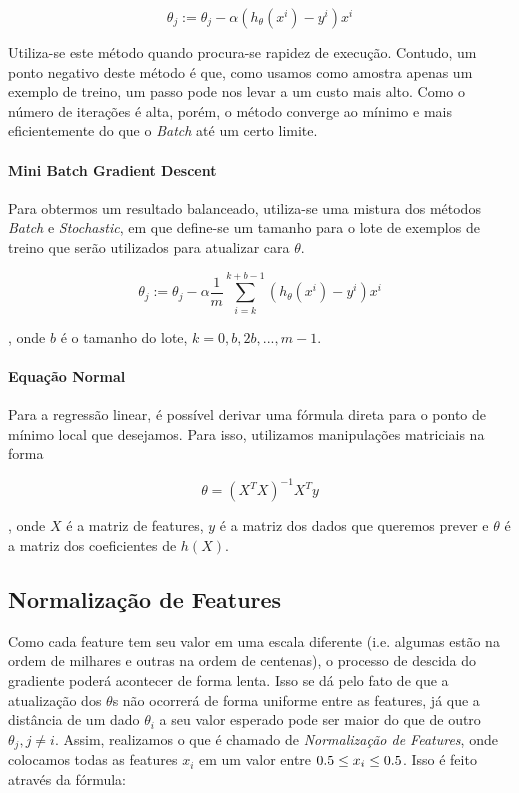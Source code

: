 \documentclass[conference]{IEEEtran}
\begin{document}
\begin{equation} \label{eq:stochastic_descent}
\theta_{j} := \theta_{j} - \alpha(h_{\theta}(x^{i}) - y^{i}) x^{i}
\end{equation}

Utiliza-se este método quando procura-se rapidez de execução. Contudo, um ponto negativo deste método é que, como usamos como amostra apenas um exemplo de treino, um passo pode nos levar a um custo mais alto. Como o número de iterações é alta, porém, o método converge ao mínimo e mais eficientemente do que o \textit{Batch} até um certo limite.

\paragraph{Mini Batch Gradient Descent}

Para obtermos um resultado balanceado, utiliza-se uma mistura dos métodos \textit{Batch} e \textit{Stochastic}, em que define-se um tamanho para o lote de exemplos de treino que serão utilizados para atualizar cara $\theta$.

\begin{equation} \label{eq:minibatch_descent}
\theta_{j} := \theta_{j} - \alpha \dfrac{1}{m} \sum_{i=k}^{k+b-1}(h_{\theta}(x^{i}) - y^{i}) x^{i}
\end{equation}

, onde $b$ é o tamanho do lote, $k = 0, b, 2b, ..., m-1$.

\paragraph{Equação Normal}

Para a regressão linear, é possível derivar uma fórmula direta para o ponto de mínimo local que desejamos. Para isso, utilizamos manipulações matriciais na forma~\cite{ayearofai}

\begin{equation} \label{eq:normal}
\theta = (X^{T}X)^{-1}X^{T}y
\end{equation}

, onde $X$ é a matriz de features, $y$ é a matriz dos dados que queremos prever e $\theta$ é a matriz dos coeficientes de $h(X)$.

\subsection{Normalização de Features}

Como cada feature tem seu valor em uma escala diferente (i.e. algumas estão na ordem de milhares e outras na ordem de centenas), o processo de descida do gradiente poderá acontecer de forma lenta. Isso se dá pelo fato de que a atualização dos $\theta$s não ocorrerá de forma uniforme entre as features, já que a distância de um dado $\theta_{i}$ a seu valor esperado pode ser maior do que de outro $\theta_{j}, j \neq i$. Assim, realizamos o que é chamado de \textit{Normalização de Features}, onde colocamos todas as features $x_{i}$ em um valor entre $ \-0.5 \leq x_{i} \leq 0.5$. Isso é feito através da fórmula:
\end{document}
